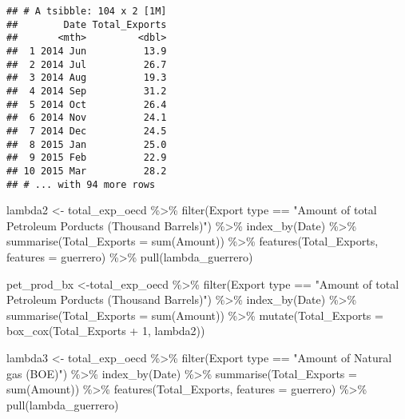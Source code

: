 \documentclass[
]{article}
\newenvironment{Shaded}{\begin{snugshade}}{\end{snugshade}}
\newcommand{\AttributeTok}[1]{\textcolor[rgb]{0.77,0.63,0.00}{#1}}
\newcommand{\DecValTok}[1]{\textcolor[rgb]{0.00,0.00,0.81}{#1}}
\newcommand{\FunctionTok}[1]{\textcolor[rgb]{0.00,0.00,0.00}{#1}}
\newcommand{\NormalTok}[1]{#1}
\newcommand{\OtherTok}[1]{\textcolor[rgb]{0.56,0.35,0.01}{#1}}
\newcommand{\SpecialCharTok}[1]{\textcolor[rgb]{0.00,0.00,0.00}{#1}}
\newcommand{\StringTok}[1]{\textcolor[rgb]{0.31,0.60,0.02}{#1}}
\begin{document}
\begin{verbatim}
## # A tsibble: 104 x 2 [1M]
##        Date Total_Exports
##       <mth>         <dbl>
##  1 2014 Jun          13.9
##  2 2014 Jul          26.7
##  3 2014 Aug          19.3
##  4 2014 Sep          31.2
##  5 2014 Oct          26.4
##  6 2014 Nov          24.1
##  7 2014 Dec          24.5
##  8 2015 Jan          25.0
##  9 2015 Feb          22.9
## 10 2015 Mar          28.2
## # ... with 94 more rows
\end{verbatim}

\begin{Shaded}
\begin{Highlighting}[]
\NormalTok{lambda2 }\OtherTok{\textless{}{-}}\NormalTok{ total\_exp\_oecd }\SpecialCharTok{\%\textgreater{}\%} 
  \FunctionTok{filter}\NormalTok{(}\StringTok{\textasciigrave{}}\AttributeTok{Export type}\StringTok{\textasciigrave{}} \SpecialCharTok{==} \StringTok{"Amount of total Petroleum Porducts (Thousand Barrels)"}\NormalTok{) }\SpecialCharTok{\%\textgreater{}\%} 
  \FunctionTok{index\_by}\NormalTok{(Date) }\SpecialCharTok{\%\textgreater{}\%} 
  \FunctionTok{summarise}\NormalTok{(}\AttributeTok{Total\_Exports =} \FunctionTok{sum}\NormalTok{(Amount)) }\SpecialCharTok{\%\textgreater{}\%} 
  \FunctionTok{features}\NormalTok{(Total\_Exports, }\AttributeTok{features =}\NormalTok{ guerrero) }\SpecialCharTok{\%\textgreater{}\%} 
  \FunctionTok{pull}\NormalTok{(lambda\_guerrero)}

\NormalTok{pet\_prod\_bx }\OtherTok{\textless{}{-}}\NormalTok{total\_exp\_oecd }\SpecialCharTok{\%\textgreater{}\%} 
  \FunctionTok{filter}\NormalTok{(}\StringTok{\textasciigrave{}}\AttributeTok{Export type}\StringTok{\textasciigrave{}} \SpecialCharTok{==} \StringTok{"Amount of total Petroleum Porducts (Thousand Barrels)"}\NormalTok{) }\SpecialCharTok{\%\textgreater{}\%} 
  \FunctionTok{index\_by}\NormalTok{(Date) }\SpecialCharTok{\%\textgreater{}\%} 
  \FunctionTok{summarise}\NormalTok{(}\AttributeTok{Total\_Exports =} \FunctionTok{sum}\NormalTok{(Amount)) }\SpecialCharTok{\%\textgreater{}\%} 
  \FunctionTok{mutate}\NormalTok{(}\AttributeTok{Total\_Exports =} \FunctionTok{box\_cox}\NormalTok{(Total\_Exports }\SpecialCharTok{+} \DecValTok{1}\NormalTok{, lambda2))}

\NormalTok{lambda3 }\OtherTok{\textless{}{-}}\NormalTok{ total\_exp\_oecd }\SpecialCharTok{\%\textgreater{}\%} 
  \FunctionTok{filter}\NormalTok{(}\StringTok{\textasciigrave{}}\AttributeTok{Export type}\StringTok{\textasciigrave{}} \SpecialCharTok{==} \StringTok{"Amount of Natural gas (BOE)"}\NormalTok{) }\SpecialCharTok{\%\textgreater{}\%} 
  \FunctionTok{index\_by}\NormalTok{(Date) }\SpecialCharTok{\%\textgreater{}\%} 
  \FunctionTok{summarise}\NormalTok{(}\AttributeTok{Total\_Exports =} \FunctionTok{sum}\NormalTok{(Amount)) }\SpecialCharTok{\%\textgreater{}\%} 
  \FunctionTok{features}\NormalTok{(Total\_Exports, }\AttributeTok{features =}\NormalTok{ guerrero) }\SpecialCharTok{\%\textgreater{}\%} 
  \FunctionTok{pull}\NormalTok{(lambda\_guerrero)}


\end{Highlighting}
\end{Shaded}
\end{document}
